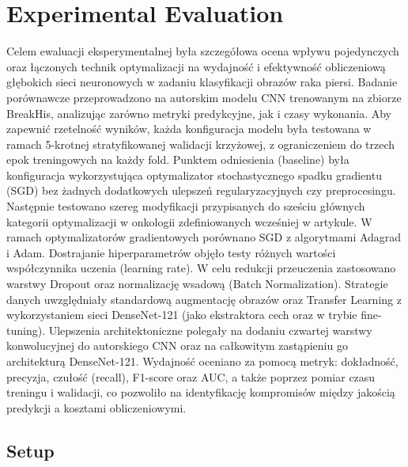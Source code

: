 \section{Experimental Evaluation}
Celem ewaluacji eksperymentalnej była szczegółowa ocena wpływu pojedynczych oraz łączonych technik optymalizacji na wydajność i efektywność obliczeniową głębokich sieci neuronowych w zadaniu klasyfikacji obrazów raka piersi. Badanie porównawcze przeprowadzono na autorskim modelu CNN trenowanym na zbiorze BreakHis, analizując zarówno metryki predykcyjne, jak i czasy wykonania. Aby zapewnić rzetelność wyników, każda konfiguracja modelu była testowana w ramach 5-krotnej stratyfikowanej walidacji krzyżowej, z ograniczeniem do trzech epok treningowych na każdy fold. Punktem odniesienia (baseline) była konfiguracja wykorzystująca optymalizator stochastycznego spadku gradientu (SGD) bez żadnych dodatkowych ulepszeń regularyzacyjnych czy preprocesingu.
Następnie testowano szereg modyfikacji przypisanych do sześciu głównych kategorii optymalizacji w onkologii zdefiniowanych wcześniej w artykule. W ramach optymalizatorów gradientowych porównano SGD z algorytmami Adagrad i Adam. Dostrajanie hiperparametrów objęło testy różnych wartości współczynnika uczenia (learning rate). W celu redukcji przeuczenia zastosowano warstwy Dropout oraz normalizację wsadową (Batch Normalization). Strategie danych uwzględniały standardową augmentację obrazów oraz Transfer Learning z wykorzystaniem sieci DenseNet-121 (jako ekstraktora cech oraz w trybie fine-tuning). Ulepszenia architektoniczne polegały na dodaniu czwartej warstwy konwolucyjnej do autorskiego CNN oraz na całkowitym zastąpieniu go architekturą DenseNet-121. Wydajność oceniano za pomocą metryk: dokładność, precyzja, czułość (recall), F1-score oraz AUC, a także poprzez pomiar czasu treningu i walidacji, co pozwoliło na identyfikację kompromisów między jakością predykcji a kosztami obliczeniowymi.


\subsection{Setup}




